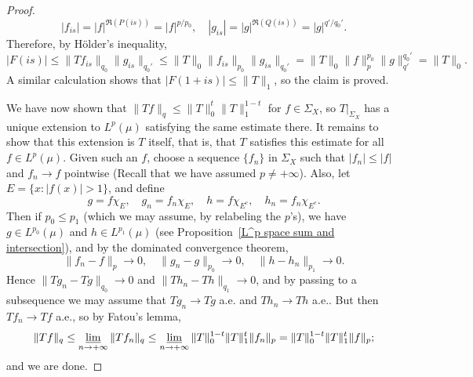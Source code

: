 \begin{proof}
\[|f_{is}|=|f|^{\Re(P(is))}=|f|^{p/p_0},\quad |g_{is}|=|g|^{\Re(Q(is))}=|g|^{q'/q_0'}.\]
Therefore, by H\"older's inequality,
\[|F(is)|\leq\|Tf_{is}\|_{q_0}\|g_{is}\|_{q_0'}\leq \|T\|_0\|f_{is}\|_{p_0}\|g_{is}\|_{q_0'}=\|T\|_0\|f\|_{p}^{p_0}\|g\|_{q'}^{q_0'}=\|T\|_0.\]
A similar calculation shows that $|F(1+is)|\leq\|T\|_1$, so the claim is proved.\par
We have now shown that $\|Tf\|_{q}\leq\|T\|_0^t\|T\|_1^{1-t}$ for $f\in\Sigma_X$, so $T|_{\Sigma_X}$ has a unique extension to $L^{p}(\mu)$ satisfying the same estimate there. It remains to show that this extension is $T$ itself, that is, that $T$ satisfies this estimate for all $f\in L^{p}(\mu)$. Given such an $f$, choose a sequence $\{f_n\}$ in $\Sigma_X$ such that $|f_n|\leq|f|$ and $f_n\to f$ pointwise (Recall that we have assumed $p\neq+\infty$). Also, let $E=\{x:|f(x)|>1\}$, and define
\[g=f\chi_E,\quad g_n=f_n\chi_E,\quad h=f\chi_{E^c},\quad h_n=f_n\chi_{E^c}.\]
Then if $p_0\leq p_1$ (which we may assume, by relabeling the $p$'s), we have $g\in L^{p_0}(\mu)$ and $h\in L^{p_1}(\mu)$ (see Proposition~\ref{L^p space sum and intersection}), and by the dominated convergence theorem,
\[\|f_n-f\|_{p}\to 0,\quad \|g_n-g\|_{p_0}\to 0,\quad\|h-h_n\|_{p_1}\to 0.\]
Hence $\|Tg_n-Tg\|_{q_0}\to 0$ and $\|Th_n-Th\|_{q_1}\to 0$, and by passing to a subsequence we may assume that $Tg_n\to Tg$ a.e. and $Th_n\to Th$ a.e.. But then $Tf_n\to Tf$ a.e., so by Fatou's lemma,
\[\|Tf\|_{q}\leq\varliminf_{n\to+\infty}\|Tf_n\|_{q}\leq\varliminf_{n\to+\infty}\|T\|_0^{1-t}\|T\|_1^{t}\|f_n\|_{p}=\|T\|_0^{1-t}\|T\|_1^{t}\|f\|_{p};\]
and we are done.
\end{proof}
